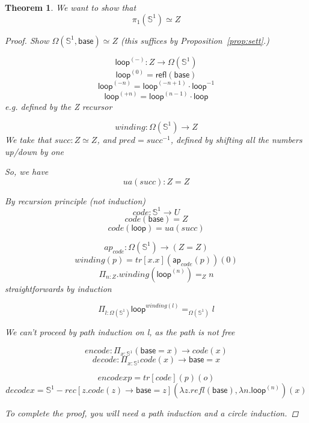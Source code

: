 \documentclass[11pt]{article}
\renewcommand{\SS}{\mathbb{S}}
\renewcommand{\refl}{\mathsf{refl}}
\newcommand {\sbase}{\mathsf{base}}
\newcommand {\sloop}{\mathsf{loop}}
\newcommand*{\ap}{\mathsf{ap}}
\newtheorem{thm}{Theorem}
\begin{document}
\begin{thm}
We want to show that
$$\pi_1(\SS^1) \simeq Z$$
\begin{proof}
Show $\Omega(\SS^1, \sbase) \simeq Z$ (this suffices by Proposition~\ref{prop:sett}.)

$$\sloop^{(-)} : Z \rightarrow \Omega(\SS^1)$$
$$\sloop^{(0)} = \refl(\sbase)$$
$$\sloop^{(-n)} = \sloop^{(-n + 1)} \cdot \sloop^{-1}$$
$$\sloop^{(+n)} = \sloop^{(n - 1)} \cdot \sloop$$
e.g. defined by the Z recursor

$$winding : \Omega(\SS^{1}) \rightarrow Z$$
We take that $succ : Z \simeq Z$, and $pred = succ^{-1}$, defined by shifting all the numbers up/down by one

So, we have
$$ua(succ) : Z = Z$$

By recursion principle (not induction)
$$code : \SS^1 \rightarrow U$$
$$code(\sbase) = Z$$
$$code(\sloop) = ua(succ)$$

$$ap_{code} : \Omega(\SS^1) \rightarrow (Z = Z)$$
$$winding(p) = tr[x.x](\ap_{code}(p))(0)$$
$$\Pi_{n : Z} . winding(\sloop^{(n)}) =_Z n$$
straightforwards by induction

$$\Pi_{l : \Omega(\SS^1)} \sloop^{winding(l)} =_{\Omega(\SS^1)} l$$

We can't proceed by path induction on l, as the path is not free

$$encode : \Pi_{x : \SS^1} (\sbase = x) \rightarrow code(x)$$
$$decode : \Pi_{x : \SS^1} code(x) \rightarrow \sbase = x$$

$$encode x p = tr[code](p)(o)$$
$$decode x = \SS^1-rec[z.code(z) \rightarrow \sbase = z](\lambda z . refl(\sbase), \lambda n . \sloop^{(n)})(x)$$

To complete the proof, you will need a path induction and a circle induction.
\end{proof}
\end{thm}
\end{document}
